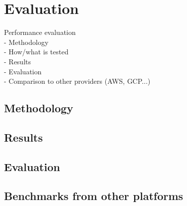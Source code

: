 \chapter{Evaluation}
\label{chapter:evaluation}

Performance evaluation \\
- Methodology \\
- How/what is tested \\
- Results \\
- Evaluation \\
- Comparison to other providers (AWS, GCP...) \\

\section{Methodology}

\section{Results}

\section{Evaluation}

\section{Benchmarks from other platforms}